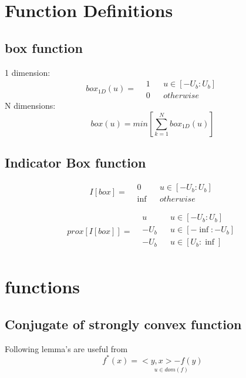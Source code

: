 \chapter{Function Definitions}
	\section{box function}
		1 dimension:
		\begin{equation}
			box_{1D}(u) =
			\begin{aligned}
			 & 1 && u \in [-U_b:U_b]\\
			 & 0 && otherwise
			\end{aligned}
			\label{eq:box function 1 dimension}
		\end{equation}
		N dimensions:
		\begin{equation}
		box(u) = min\left[ \sum_{k=1}^ N box_{1D}(u) \right]
		\label{eq:box function N dimensions}
		\end{equation}
	\section{Indicator Box function}
		\begin{equation}
			I[box]=
			\begin{aligned}
			& 0 && u \in [-U_b:U_b]\\
			& \inf && otherwise
			\end{aligned}
		\end{equation}
		
		\begin{equation}
		prox[I[box]]=
		\begin{aligned}
		& u && u \in [-U_b:U_b]\\
		& -U_b && u \in [-\inf:-U_b]\\
		& -U_b && u \in [U_b:\inf]\\
		\end{aligned}
		\end{equation}
\chapter{functions}

	\section{Conjugate of strongly convex function}
		Following lemma's are useful from 
		\begin{equation}
			f^*(x)= \underset{u \in dom(f)}{<y,x>-f(y)}
		\end{equation}
		
